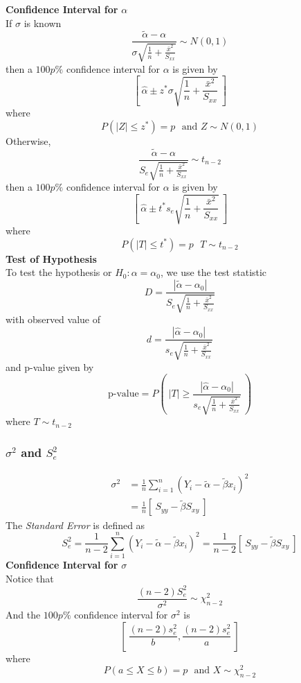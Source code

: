 \documentclass[12pt, leqno]{article}
\theoremstyle{definition}
\begin{document}
  \textbf{Confidence Interval for} $\alpha$ \\
  If $\sigma$ is known
  $$\frac{\widetilde{\alpha} - \alpha}{\sigma \sqrt{\frac{1}{n} + \frac{\bar{x}^{2}}{S_{xx}}}} \sim N(0, 1)$$
  then a $100p\%$ confidence interval for $\alpha$ is given by
  $$\left[~ \hat{\alpha} \pm z^{*}\sigma \sqrt{\frac{1}{n} + \frac{\bar{x}^{2}}{S_{xx}}} ~\right]$$
  where
  $$P(|Z| \leq z^{*}) = p ~~~\text{and } Z \sim N(0, 1)$$
  \newline
  Otherwise,
  $$\frac{\widetilde{\alpha} - \alpha}{S_{e}\sqrt{\frac{1}{n} + \frac{\bar{x}^{2}}{S_{xx}}}} \sim t_{n-2}$$
  then a $100p\%$ confidence interval for $\alpha$ is given by
  $$\left[~ \hat{\alpha} \pm t^{*}s_{e}\sqrt{\frac{1}{n} + \frac{\bar{x}^{2}}{S_{xx}}} ~\right]$$
  where
  $$P(|T| \leq t^{*}) = p ~~~ T \sim t_{n-2}$$
  \newline
  \textbf{Test of Hypothesis} \\
  To test the hypothesis or $H_{0}: \alpha = \alpha_{0}$, we use the test statistic
  $$D = \frac{|\widetilde{\alpha} - \alpha_{0}|}{S_{e}\sqrt{\frac{1}{n} + \frac{\bar{x}^{2}}{S_{xx}}}}$$
  with observed value of
  $$d = \frac{|\hat{\alpha} - \alpha_{0}|}{s_{e}\sqrt{\frac{1}{n} + \frac{\bar{x}^{2}}{S_{xx}}}}$$
  and p-value given by
  $$\text{p-value} = P\left(~|T| \geq \frac{|\hat{\alpha} - \alpha_{0}|}{s_{e}\sqrt{\frac{1}{n} + \frac{\bar{x}^{2}}{S_{xx}}}}~\right)$$
  where $T \sim t_{n-2}$

  \subsubsection{$\sigma^{2}$ and $S_{e}^{2}$}
  \begin{align*}
  \sigma^{2} &= \frac{1}{n} \sum_{i=1}^{n} (Y_{i} - \widetilde{\alpha} - \widetilde{\beta}x_{i})^{2} \\
  &= \frac{1}{n}\left[~S_{yy} - \widetilde{\beta}S_{xy}~\right]
  \end{align*}
  The \emph{Standard Error} is defined as
  $$
  S_{e}^{2}
  = \frac{1}{n - 2} \sum_{i=1}^{n} (Y_{i} - \widetilde{\alpha} - \widetilde{\beta}x_{i})^{2}
  = \frac{1}{n - 2}\left[~S_{yy} - \widetilde{\beta}S_{xy}~\right]
  $$
  \textbf{Confidence Interval for} $\sigma$ \\
  Notice that
  $$\frac{(n-2)S_{e}^{2}}{\sigma^{2}} \sim \chi_{n-2}^{2}$$
  And the $100p\%$ confidence interval for $\sigma^{2}$ is
  $$\left[~\frac{(n-2)s_{e}^{2}}{b}, \frac{(n-2)s_{e}^{2}}{a}~\right]$$
  where
  $$P(a \leq X \leq b) = p ~~~\text{and } X \sim \chi_{n-2}^{2}$$
\end{document}
